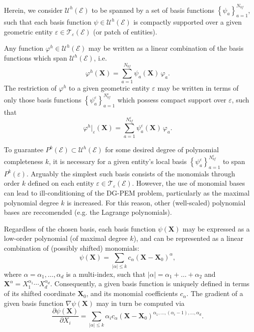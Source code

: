 		Herein, we consider $\mathcal{U}^h (\mathcal{E})$ to be spanned by a set of basis functions $\left\{ \psi_a \right\}_{a=1}^{N_{bf}}$, such that each basis function $\psi \in \mathcal{U}^h (\mathcal{E})$ is compactly supported over a given geometric entity $\varepsilon \in \mathcal{T}_\varepsilon (\mathcal{E})$ (or patch of entities).
		
		Any function $\varphi^h \in \mathcal{U}^h (\mathcal{E})$ may be written as a linear combination of the basis functions which span $\mathcal{U}^h (\mathcal{E})$, i.e.
		\begin{equation}
			\varphi^h (\mathbf{X}) = \sum_{a=1}^{N_{bf}} \psi_a (\mathbf{X}) \, \varphi_a.
		\end{equation}
		The restriction of $\varphi^h$ to a given geometric entity $\varepsilon$ may be written in terms of only those basis functions $\left\{ \psi^\varepsilon_a \right\}_{a=1}^{N^\varepsilon_{bf}}$ which possess compact support over $\varepsilon$, such that
		\begin{equation}
			\varphi^h|_\varepsilon (\mathbf{X}) = \sum_{a=1}^{N^\varepsilon_{bf}} \psi^\varepsilon_a (\mathbf{X}) \, \varphi_a.
		\end{equation}
		
		To guarantee $P^k (\mathcal{E}) \subset \mathcal{U}^h (\mathcal{E})$ for some desired degree of polynomial completeness $k$, it is necessary for a given entity's local basis $\left\{ \psi^\varepsilon_a \right\}_{a=1}^{N^\varepsilon_{bf}}$ to span $P^k (\varepsilon)$. Arguably the simplest such basis consists of the monomials through order $k$ defined on each entity $\varepsilon \in \mathcal{T}_\varepsilon (\mathcal{E})$. However, the use of monomial bases can lead to ill-conditioning of the DG-PEM problem, particularly as the maximal polynomial degree $k$ is increased. For this reason, other (well-scaled) polynomial bases are reccomended (e.g. the Lagrange polynomials).
		
		Regardless of the chosen basis, each basis function $\psi (\mathbf{X})$ may be expressed as a low-order polynomial (of maximal degree $k$), and can be represented as a linear combination of (possibly shifted) monomials:
		\begin{equation}
			\psi (\mathbf{X}) = \sum_{|\alpha| \leq k} c_\alpha (\mathbf{X}-\mathbf{X}_0)^{\alpha},
		\end{equation}
		where $\alpha = \alpha_1, \ldots, \alpha_d$ is a multi-index, such that $|\alpha| = \alpha_1 + \ldots + \alpha_2$ and $\mathbf{X}^\alpha = X_1^{\alpha_1} \cdots X_d^{\alpha_d}$. Consequently, a given basis function is uniquely defined in terms of its shifted coordinate $\mathbf{X}_0$, and its monomial coefficients $c_\alpha$. The gradient of a given basis function $\nabla \psi (\mathbf{X})$ may in turn be computed via
		\begin{equation}
			\frac{\partial \psi (\mathbf{X})}{\partial X_i} = \sum_{|\alpha| \leq k} \alpha_i c_\alpha (\mathbf{X}-\mathbf{X}_0)^{\alpha_1, \ldots, (\alpha_i - 1), \ldots, \alpha_d}.
		\end{equation}
		
